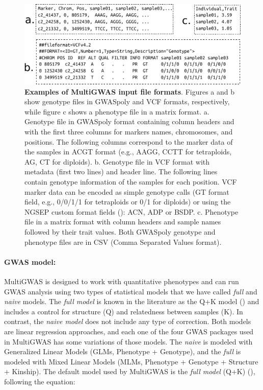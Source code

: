 \documentclass{article}
\begin{document}
\begin{figure}[H]
\begin{centering}
\includegraphics{images/paper-input-files}
\par\end{centering}
\caption{\scriptsize \textbf{{Examples of MultiGWAS input file formats}}. Figures a and b show genotype files in GWASpoly and VCF formats, respectively, while figure c shows a phenotype file in a matrix format. a. Genotype file in GWASpoly format containing column headers and with the first three columns for markers names, chromosomes, and positions. The following columns correspond to the marker data of the samples in \textquotedbl{}ACGT\textquotedbl{} format (e.g., AAGG, CCTT for tetraploids, AG, CT for diploids). b. Genotype file in VCF format with metadata (first two lines) and header line. The following lines contain genotype information of the samples for each position. VCF marker data can be encoded as simple genotype calls (GT format field, e.g., 0/0/1/1 for tetraploids or 0/1 for diploids) or using the NGSEP custom format fields (\cite{Duitama2019}): ACN, ADP or BSDP. c. Phenotype file in a matrix format with column headers and sample names followed by their trait values. Both GWASpoly genotype and phenotype files are in CSV (Comma Separated Values format).} \label{fig:File-Formats}\protect 
\end{figure}


\paragraph{GWAS model:}

MultiGWAS is designed to work with quantitative phenotypes and can run GWAS analysis using two types of statistical models that we have called \emph{full} and \emph{naive} models. The \emph{full model} is known in the literature as the Q+K model (\cite{Yu2006}) and includes a control for structure (Q) and relatedness between samples (K). In contrast, the \emph{naive model} does not include any type of correction. Both models are linear regression approaches, and each one of the four GWAS packages used in MultiGWAS has some variations of those models. The \emph{naive} is modeled with Generalized Linear Models (GLMs, Phenotype + Genotype), and the \emph{full} is modeled with Mixed Linear Models (MLMs, Phenotype + Genotype + Structure + Kinship). The default model used by MultiGWAS is the \emph{full model} (Q+K) (\cite{Yu2006}), following the equation:
\end{document}
